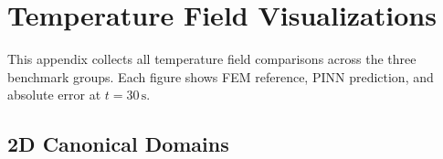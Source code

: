 \chapter{Temperature Field Visualizations}
\label{app:temp_fields}

This appendix collects all temperature field comparisons across the three
benchmark groups.
Each figure shows FEM reference, PINN prediction, and absolute error at
$t=30\,\mathrm{s}$.

\section*{2D Canonical Domains}

